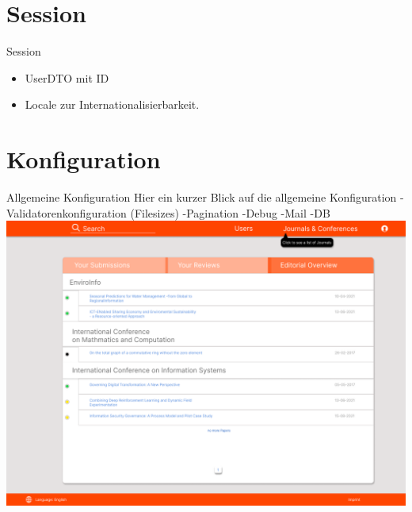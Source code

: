 \documentclass{beamer}
\begin{document}
    \section{Session}
    \begin{frame}{Session}
        \begin{itemize}
            \item User\-DTO mit ID
            \pause
            \item Locale zur Internationalisierbarkeit.
        \end{itemize}
    \end{frame}


    \section{Konfiguration}
    \begin{frame}{Allgemeine Konfiguration}
        Hier ein kurzer Blick auf die allgemeine Konfiguration
        -Validatorenkonfiguration (Filesizes)
        -Pagination
        -Debug
        -Mail
        -DB
        \centering
        \includegraphics[height=0.75\textheight]{../../docs/Pflichtenheft/graphics/Homepage-png}
    \end{frame}
\end{document}
